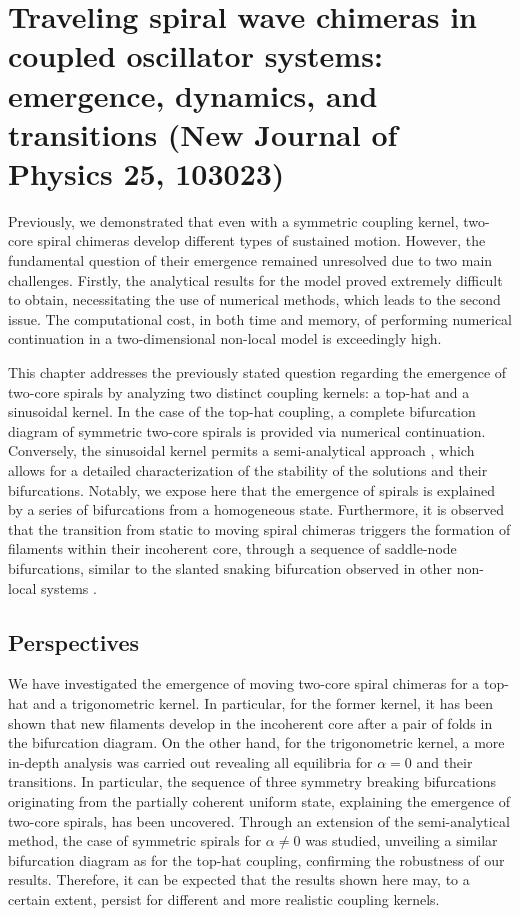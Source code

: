 \chapter{Traveling spiral wave chimeras in coupled
oscillator systems: emergence, dynamics, and
transitions (New Journal of Physics 25, 103023)}

Previously, we demonstrated that even with a symmetric coupling kernel, two-core spiral chimeras develop different
types of sustained motion. However, the fundamental question of their emergence remained
unresolved due to two main challenges. Firstly, the analytical results for the model proved
extremely difficult to obtain, necessitating the use of numerical methods, which leads to the second 
issue. The computational cost, in both time
and memory, of performing numerical continuation in a two-dimensional non-local model is exceedingly high.

This chapter addresses the previously stated question regarding the emergence of two-core spirals by analyzing two distinct coupling kernels: a
top-hat and a sinusoidal kernel. In the case of the top-hat coupling, a complete bifurcation diagram of symmetric two-core spirals
is provided via numerical continuation. Conversely, the sinusoidal kernel
permits a semi-analytical approach \cite{omel2018stability,xie2015twisted,omel2019chimerapedia}, which allows for a detailed 
characterization of the stability of the solutions and their bifurcations. Notably,
we expose here that the emergence of spirals is explained by a series of bifurcations from a homogeneous
state. Furthermore, it is observed that the transition from static to moving spiral chimeras
triggers the formation of filaments within their incoherent core, through a sequence of saddle-node
bifurcations, similar to the slanted snaking bifurcation observed in other non-local systems
\cite{firth2007proposed,firth20017homoclinic,barbay2008homoclinic,thiele2013localized}. 



\section{Perspectives}

We have investigated the emergence of moving two-core spiral chimeras for a top-hat
and a trigonometric kernel. In particular, for the former kernel, it has been shown
that new filaments develop in the incoherent core after a pair of folds in the bifurcation diagram.
On the other hand, for the trigonometric kernel, a more in-depth analysis was carried out
revealing all equilibria for $\alpha=0$ and their transitions. In particular, the sequence
of three symmetry breaking bifurcations originating from the partially coherent uniform state, 
explaining the emergence of two-core spirals, has been uncovered. Through an extension of the
semi-analytical method, the case of symmetric spirals for $\alpha \neq 0$ was studied, unveiling a similar
bifurcation diagram as for the top-hat coupling, confirming the robustness of our results.
Therefore, it can be expected that the results shown here may, to a certain extent, persist
for different and more realistic coupling kernels. 

